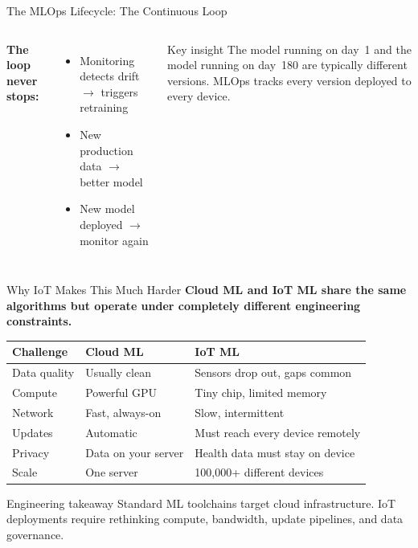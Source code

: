 \documentclass[aspectratio=169,11pt]{beamer}
\begin{document}
\begin{frame}[shrink]{The MLOps Lifecycle: The Continuous Loop}
\begin{columns}
        \textbf{The loop never stops:}
        \begin{itemize}\setlength{\itemsep}{0pt}
            \item Monitoring detects drift $\rightarrow$ triggers retraining
            \item New production data $\rightarrow$ better model
            \item New model deployed $\rightarrow$ monitor again
        \end{itemize}

        \vspace{0.03cm}
        \begin{exampleblock}{Key insight}
            The model running on day~1 and the model running on day~180 are typically different versions. MLOps tracks every version deployed to every device.
        \end{exampleblock}
    \end{columns}
\end{frame}

\begin{frame}[shrink]{Why IoT Makes This Much Harder}
    \small
    \textbf{Cloud ML and IoT ML share the same algorithms but operate under completely different engineering constraints.}

    \vspace{0.2cm}
    \begin{center}
    \small
    \begin{tabular}{p{3.0cm} p{3.8cm} p{4.0cm}}
        \toprule
        \textbf{Challenge} & \textbf{Cloud ML} & \textbf{IoT ML} \\
        \midrule
        Data quality & Usually clean & Sensors drop out, gaps common \\
        Compute & Powerful GPU & Tiny chip, limited memory \\
        Network & Fast, always-on & Slow, intermittent \\
        Updates & Automatic & Must reach every device remotely \\
        Privacy & Data on your server & Health data must stay on device \\
        Scale & One server & 100,000+ different devices \\
        \bottomrule
    \end{tabular}
    \end{center}

    \vspace{0.15cm}
    \begin{exampleblock}{Engineering takeaway}
        Standard ML toolchains target cloud infrastructure. IoT deployments require rethinking compute, bandwidth, update pipelines, and data governance.
    \end{exampleblock}
\end{frame}
\end{document}

